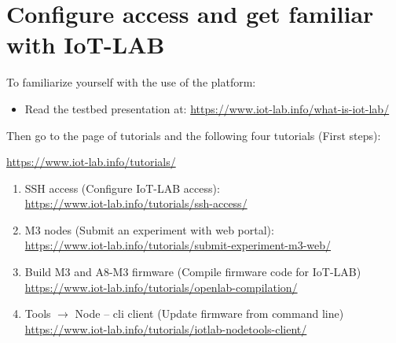 \documentclass[oneside]{article}
\begin{document}
\newpage

\section{Configure access and get familiar with IoT-LAB}

To familiarize yourself with the use of the platform:
\begin{itemize}
\item Read the testbed presentation at: \url{https://www.iot-lab.info/what-is-iot-lab/}
\end{itemize}


Then go to the page of tutorials and the following four tutorials (First steps):
\begin{center} \url{https://www.iot-lab.info/tutorials/} \end{center}
\begin{enumerate}
   \item SSH access (Configure IoT-LAB access): \\
   \url{https://www.iot-lab.info/tutorials/ssh-access/}
   \item M3 nodes (Submit an experiment with web portal): \\
   \url{https://www.iot-lab.info/tutorials/submit-experiment-m3-web/}
   \item Build M3 and A8-M3 firmware (Compile firmware code for IoT-LAB)\\
   \url{https://www.iot-lab.info/tutorials/openlab-compilation/}
   \item Tools $\to$ Node -- cli client (Update firmware from command line) \\
   \url{https://www.iot-lab.info/tutorials/iotlab-nodetools-client/}
\end{enumerate}
\end{document}
